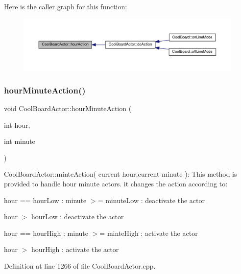 Here is the caller graph for this function\+:\nopagebreak
\begin{figure}[H]
\begin{center}
\leavevmode
\includegraphics[width=350pt]{dc/d69/class_cool_board_actor_adf3b4e15b9d73681082112adf8ef95cb_icgraph}
\end{center}
\end{figure}
\mbox{\label{class_cool_board_actor_a1eb1fbca19bc80aad20d2686d52317f8}} 
\subsubsection{\texorpdfstring{hour\+Minute\+Action()}{hourMinuteAction()}}
{\footnotesize\ttfamily void Cool\+Board\+Actor\+::hour\+Minute\+Action (\begin{DoxyParamCaption}\item[{int}]{hour,  }\item[{int}]{minute }\end{DoxyParamCaption})}

Cool\+Board\+Actor\+::minte\+Action( current hour,current minute )\+: This method is provided to handle hour minute actors. it changes the action according to\+:

hour == hour\+Low \+: minute $>$= minute\+Low \+: deactivate the actor

hour $>$ hour\+Low \+: deactivate the actor

hour == hour\+High \+: minute $>$= minte\+High \+: activate the actor

hour $>$ hour\+High \+: activate the actor 

Definition at line 1266 of file Cool\+Board\+Actor.\+cpp.



